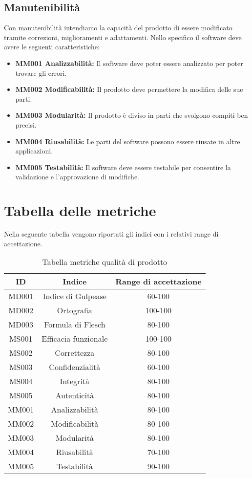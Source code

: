 \subsection{Manutenibilità}
Con manutenibilità intendiamo la capacità del prodotto di essere modificato tramite correzioni, miglioramenti e adattamenti.
Nello specifico il software deve avere le seguenti caratteristiche:
\begin{itemize}
	\item \textbf{MM001 Analizzabilità:} Il software deve poter essere analizzato per poter trovare gli errori.
	\item \textbf{MM002 Modificabilità:} Il prodotto deve permettere la modifica delle sue parti.
	\item \textbf{MM003 Modularità:} Il prodotto è diviso in parti che svolgono compiti ben precisi.
	\item \textbf{MM004 Riusabilità:} Le parti del software possono essere riusate in altre applicazioni.
	\item \textbf{MM005 Testabilità:} Il software deve essere testabile per consentire la validazione e l'approvazione di modifiche.
\end{itemize}
\section{Tabella delle metriche}
Nella seguente tabella vengono riportati gli indici con i relativi range di accettazione.\\
\begin{table}[h]
    \begin{center}
      \begin{tabular}{|c|c|c|}
        \hline
        \textbf{ID} & \textbf{Indice}       & \textbf{Range di accettazione}\\
        \hline
        MD001       & Indice di Gulpease    & 60-100\\
        MD002       & Ortografia            & 100-100\\
        MD003       & Formula di Flesch     & 80-100\\\hline
        MS001       & Efficacia funzionale  & 100-100\\
        MS002       & Correttezza  			& 80-100\\
        MS003       & Confidenzialità 	 	& 60-100\\
        MS004       & Integrità  			& 80-100\\
        MS005       & Autenticità		    & 80-100\\\hline
        MM001       & Analizzabilità	    & 80-100\\
        MM002       & Modificabilità		& 80-100\\
        MM003       & Modularità		    & 80-100\\
        MM004       & Riusabilità			& 70-100\\
		MM005       & Testabilità			& 90-100\\
        \hline
      \end{tabular}
      \caption{Tabella metriche qualità di prodotto}
    \end{center}
\end{table}